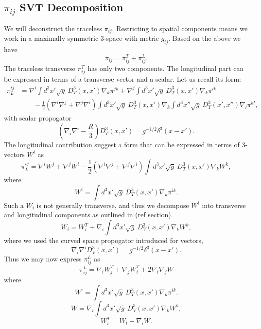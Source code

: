 \documentclass[10pt,letterpaper]{article}
\begin{document}
\subsection{$\pi_{ij}$ SVT Decomposition }
We will deconstruct the traceless $\pi_{ij}$. Restricting to spatial components means we work in a maximally symmetric 3-space with metric $g_{ij}$. 
Based on the above we have
\begin{equation}
\pi_{ij} = \pi_{ij}^{T} + \pi^L_{ij}.
\end{equation}
The traceless transverse $\pi_{ij}^T$ has only two components. The longitudinal part can be expressed in terms of a transverse vector and a scalar. Let us recall its form:
\begin{align}
  \pi^{ij}_L&=\nabla^i \int d^3x' \sqrt{g}\ D^3_T(x,x')\nabla_k \pi^{jk} + \nabla^j \int d^3x' \sqrt{g}\  D^3_T(x,x')\nabla_k \pi^{ik} 
\\
&\qquad -  
 \frac12(\nabla^i\nabla^j+\nabla^j\nabla^i) \int d^3x'\sqrt{g}\  D^3_T(x,x') \nabla_k \int d^3x'' \sqrt{g}\ D^3_T(x',x'')\nabla_l \pi^{kl},
\end{align}
with scalar propogator
\begin{equation}
\left( \nabla_i \nabla^i -\frac{R}{3} \right)D^3_{T}(x,x') = g^{-1/2} \delta^3(x-x').
\end{equation}
The longitudinal contribution suggest a form that can be expressed in terms of 3-vectors $W^i$ as
\begin{equation}
\pi^{ij}_L = \nabla^i W^j + \nabla^j W^i - \frac12(\nabla^i\nabla^j+\nabla^j\nabla^i) \int d^3x'\sqrt{g}\  D^3_T(x,x') \nabla_k W^k,
\end{equation}
where
\begin{equation}
W^{i} =    \int d^3x'\sqrt{g}\  D^3_T(x,x') \nabla_k \pi^{ik}.
\end{equation}
Such a $W_i$ is not generally transverse, and thus we decompose $W^i$ into transverse and longitudinal components as outlined in (ref section).
\begin{equation}
W_i = W_i^T + \nabla_i \int d^3x' \sqrt{g}\ D_V^3(x,x')\nabla_k W^k,
\end{equation}
where we used the curved space propogator introduced for vectors,
\begin{equation}
\nabla_i \nabla^i D^3_V(x,x') = g^{-1/2}\delta^3(x-x').
\end{equation}
Thus we may now express $\pi_{ij}^L$ as
\begin{equation}
\pi_{ij}^L =  \nabla_i W_j^T + \nabla_j W_i^T + 2\nabla_i\nabla_j W
\end{equation}
where
\begin{equation}
W^{i} =    \int d^3x'\sqrt{g}\  D^3_T(x,x') \nabla_k \pi^{ik}.
\end{equation}
\begin{equation}
W =  \nabla_i \int d^3x' \sqrt{g}\ D_V^3(x,x')\nabla_k W^k,
\end{equation}
\begin{equation}
W_i^T = W_i - \nabla_i W.
\end{equation}
\end{document}
